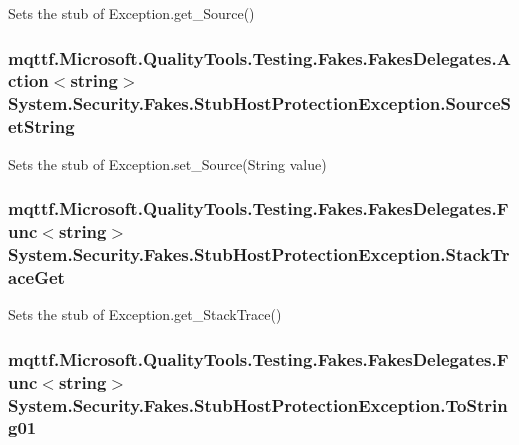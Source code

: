 Sets the stub of Exception.\-get\-\_\-\-Source()

\hypertarget{class_system_1_1_security_1_1_fakes_1_1_stub_host_protection_exception_aa78fdf23ac02b0a3aaffebd39f03c3c2}{
\subsubsection[{Source\-Set\-String}]{\setlength{\rightskip}{0pt plus 5cm}mqttf.\-Microsoft.\-Quality\-Tools.\-Testing.\-Fakes.\-Fakes\-Delegates.\-Action$<$string$>$ System.\-Security.\-Fakes.\-Stub\-Host\-Protection\-Exception.\-Source\-Set\-String}}\label{class_system_1_1_security_1_1_fakes_1_1_stub_host_protection_exception_aa78fdf23ac02b0a3aaffebd39f03c3c2}


Sets the stub of Exception.\-set\-\_\-\-Source(\-String value)

\hypertarget{class_system_1_1_security_1_1_fakes_1_1_stub_host_protection_exception_a2b7b5c8fb27b4decc339762d3af81120}{
\subsubsection[{Stack\-Trace\-Get}]{\setlength{\rightskip}{0pt plus 5cm}mqttf.\-Microsoft.\-Quality\-Tools.\-Testing.\-Fakes.\-Fakes\-Delegates.\-Func$<$string$>$ System.\-Security.\-Fakes.\-Stub\-Host\-Protection\-Exception.\-Stack\-Trace\-Get}}\label{class_system_1_1_security_1_1_fakes_1_1_stub_host_protection_exception_a2b7b5c8fb27b4decc339762d3af81120}


Sets the stub of Exception.\-get\-\_\-\-Stack\-Trace()

\hypertarget{class_system_1_1_security_1_1_fakes_1_1_stub_host_protection_exception_a2c2c5a2f0823cba9eaa072eb100a7042}{
\subsubsection[{To\-String01}]{\setlength{\rightskip}{0pt plus 5cm}mqttf.\-Microsoft.\-Quality\-Tools.\-Testing.\-Fakes.\-Fakes\-Delegates.\-Func$<$string$>$ System.\-Security.\-Fakes.\-Stub\-Host\-Protection\-Exception.\-To\-String01}}\label{class_system_1_1_security_1_1_fakes_1_1_stub_host_protection_exception_a2c2c5a2f0823cba9eaa072eb100a7042}


